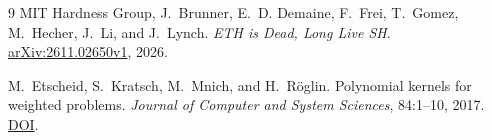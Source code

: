 \documentclass[11pt]{article}
\begin{document}
\begin{thebibliography}{9}
MIT Hardness Group, J.~Brunner, E.~D. Demaine, F.~Frei, T.~Gomez,
M.~Hecher, J.~Li, and J.~Lynch.
\emph{ETH is Dead, Long Live SH}.
\href{https://arxiv.org/abs/2611.02650v1}{arXiv:2611.02650v1}, 2026.

M.~Etscheid, S.~Kratsch, M.~Mnich, and H.~Röglin.
Polynomial kernels for weighted problems.
\emph{Journal of Computer and System Sciences}, 84:1--10, 2017.
\href{https://doi.org/10.1016/j.jcss.2016.06.004}{DOI}.
\end{thebibliography}
\end{document}
